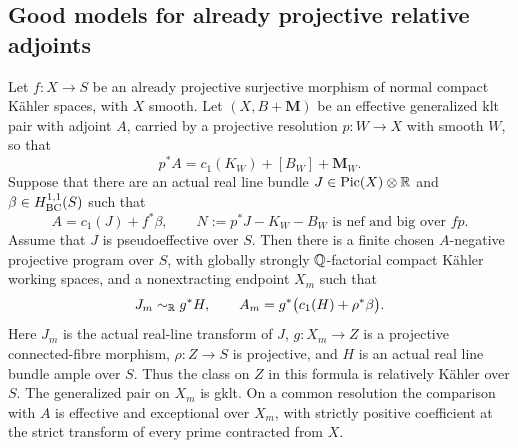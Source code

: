 \subsection{Good models for already projective relative adjoints}

\begin{proposition}
\label{prog:projective-good-model}
Let \(f:X\to S\) be an already projective surjective morphism of
normal compact Kähler spaces, with \(X\) smooth. Let
\((X,B+\mathbf M)\) be an effective generalized klt pair with adjoint
\(A\), carried by a projective resolution \(p:W\to X\) with smooth
\(W\), so that
\[
 p^*A=c_1(K_W)+[B_W]+\mathbf M_W.
\]
Suppose that there are an actual real line bundle
\(J\in\operatorname{Pic}(X)\otimes\mathbb R\) and
\(\beta\in H^{1,1}_{\mathrm{BC}}(S)\) such that
\[
 A=c_1(J)+f^*\beta,
 \qquad
 N:=p^*J-K_W-B_W
 \text{ is nef and big over }fp.
\]
Assume that \(J\) is pseudoeffective over \(S\).
Then there is a finite chosen \(A\)-negative projective program over
\(S\), with globally strongly \(\mathbb Q\)-factorial compact Kähler
working spaces, and a nonextracting endpoint \(X_m\) such that
\[
 J_m\sim_{\mathbb R}g^*H,
 \qquad
 A_m=g^*\bigl(c_1(H)+\rho^*\beta\bigr).
\]
Here \(J_m\) is the actual real-line transform of \(J\),
\(g:X_m\to Z\) is a projective connected-fibre morphism,
\(\rho:Z\to S\) is projective, and \(H\) is an actual real line
bundle ample over \(S\). Thus the class on \(Z\) in this formula is
relatively Kähler over \(S\). The generalized pair on \(X_m\) is
gklt. On a common resolution the comparison with \(A\) is effective
and exceptional over \(X_m\), with strictly positive coefficient
at the strict transform of every prime contracted from \(X\).
\end{proposition}


